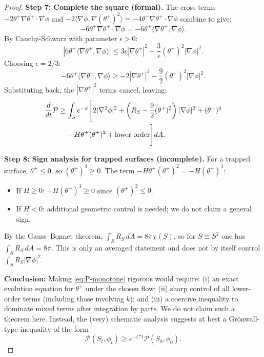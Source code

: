 \begin{proof}
\textbf{Step 7: Complete the square (formal).}
The cross terms $-2\theta^+\nabla\theta^+\cdot\nabla\phi$ and $-2\langle\nabla\phi, \nabla(\theta^+)^2\rangle = -4\theta^+\nabla\theta^+\cdot\nabla\phi$ combine to give:
\begin{equation}
-6\theta^+\nabla\theta^+\cdot\nabla\phi = -6\theta^+\langle\nabla\theta^+, \nabla\phi\rangle.
\end{equation}
By Cauchy-Schwarz with parameter $\epsilon > 0$:
\begin{equation}
\left|6\theta^+\langle\nabla\theta^+, \nabla\phi\rangle\right| \leq 3\epsilon|\nabla\theta^+|^2 + \frac{3}{\epsilon}(\theta^+)^2|\nabla\phi|^2.
\end{equation}
Choosing $\epsilon = 2/3$:
\begin{equation}
-6\theta^+\langle\nabla\theta^+, \nabla\phi\rangle \geq -2|\nabla\theta^+|^2 - \frac{9}{2}(\theta^+)^2|\nabla\phi|^2.
\end{equation}
Substituting back, the $|\nabla\theta^+|^2$ terms cancel, leaving:
\begin{align}
\frac{d}{dt}\mathcal{P} &\geq \int_S e^{-\phi}\Bigg[2|\nabla^2\phi|^2 + \left(R_S - \frac{9}{2}(\theta^+)^2\right)|\nabla\phi|^2 + (\theta^+)^4 \notag\\
&\quad - H\theta^+(\theta^+)^2 + \text{lower order}\Bigg]dA.
\end{align}

\textbf{Step 8: Sign analysis for trapped surfaces (incomplete).}
For a trapped surface, $\theta^+ \leq 0$, so $(\theta^+)^4 \geq 0$. The term $-H\theta^+(\theta^+)^2 = -H(\theta^+)^3$:
\begin{itemize}
\item If $H \geq 0$: $-H(\theta^+)^3 \geq 0$ since $(\theta^+)^3 \leq 0$.
\item If $H < 0$: additional geometric control is needed; we do not claim a general sign.
\end{itemize}

By the Gauss--Bonnet theorem, $\int_S R_S \, dA = 8\pi\chi(S)$, so for $S\cong S^2$ one has $\int_S R_S\,dA=8\pi$. This is only an averaged statement and does not by itself control $\int_S R_S|\nabla\phi|^2$.

\textbf{Conclusion:} Making \eqref{eq:P-monotone} rigorous would require: (i) an exact evolution equation for $\theta^+$ under the chosen flow; (ii) sharp control of all lower-order terms (including those involving $k$); and (iii) a coercive inequality to dominate mixed terms after integration by parts. We do not claim such a theorem here. Instead, the (very) schematic analysis suggests at best a Gr\"onwall-type inequality of the form
\begin{equation}
\mathcal{P}(S_t, \phi_t) \geq e^{-C't}\mathcal{P}(S_0, \phi_0).
\end{equation}


\end{proof}
